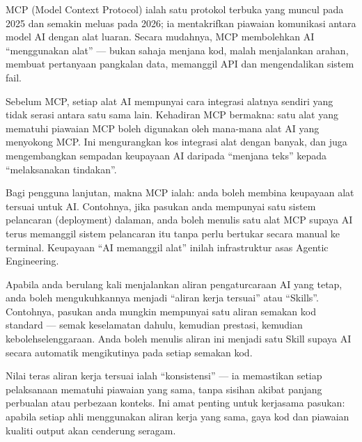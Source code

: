 


MCP (Model Context Protocol) ialah satu protokol terbuka yang muncul pada 2025 dan semakin meluas pada 2026; ia mentakrifkan piawaian komunikasi antara model AI dengan alat luaran. Secara mudahnya, MCP membolehkan AI “menggunakan alat” — bukan sahaja menjana kod, malah menjalankan arahan, membuat pertanyaan pangkalan data, memanggil API dan mengendalikan sistem fail.

Sebelum MCP, setiap alat AI mempunyai cara integrasi alatnya sendiri yang tidak serasi antara satu sama lain. Kehadiran MCP bermakna: satu alat yang mematuhi piawaian MCP boleh digunakan oleh mana-mana alat AI yang menyokong MCP. Ini mengurangkan kos integrasi alat dengan banyak, dan juga mengembangkan sempadan keupayaan AI daripada “menjana teks” kepada “melaksanakan tindakan”.

Bagi pengguna lanjutan, makna MCP ialah: anda boleh membina keupayaan alat tersuai untuk AI. Contohnya, jika pasukan anda mempunyai satu sistem pelancaran (deployment) dalaman, anda boleh menulis satu alat MCP supaya AI terus memanggil sistem pelancaran itu tanpa perlu bertukar secara manual ke terminal. Keupayaan “AI memanggil alat” inilah infrastruktur asas Agentic Engineering.


Apabila anda berulang kali menjalankan aliran pengaturcaraan AI yang tetap, anda boleh mengukuhkannya menjadi “aliran kerja tersuai” atau “Skills”. Contohnya, pasukan anda mungkin mempunyai satu aliran semakan kod standard — semak keselamatan dahulu, kemudian prestasi, kemudian kebolehselenggaraan. Anda boleh menulis aliran ini menjadi satu Skill supaya AI secara automatik mengikutinya pada setiap semakan kod.

Nilai teras aliran kerja tersuai ialah “konsistensi” — ia memastikan setiap pelaksanaan mematuhi piawaian yang sama, tanpa sisihan akibat panjang perbualan atau perbezaan konteks. Ini amat penting untuk kerjasama pasukan: apabila setiap ahli menggunakan aliran kerja yang sama, gaya kod dan piawaian kualiti output akan cenderung seragam.

